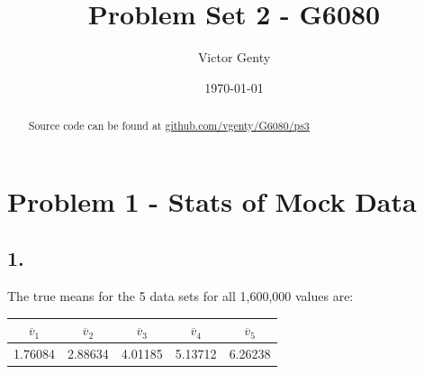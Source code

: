 \documentclass[singlepage,notitlepage,nofootinbib,11pt]{revtex4-1}
\begin{document}
\title{Problem Set 2 - G6080}
\author{Victor Genty}
\date{\today}
\begin{abstract}
\centering
Source code can be found at \href{https://github.com/vgenty/G6080/tree/master/ps3}{github.com/vgenty/G6080/ps3}
\end{abstract}
\maketitle
\section{Problem 1 - Stats of Mock Data}
\subsection{1.}
The true means for the 5 data sets for all 1,600,000 values are:
\begin{center}
\begin{tabular}{ | c | c | c | c | c |}\hline
  $\overline{v}_1$ &  $\overline{v}_2$ &  $\overline{v}_3$ &  $\overline{v}_4$ &  $\overline{v}_5$  \\ \hline \hline 
  1.76084 & 2.88634 & 4.01185 & 5.13712 & 6.26238 \\ \hline
\end{tabular}
\end{center}
\end{document}
